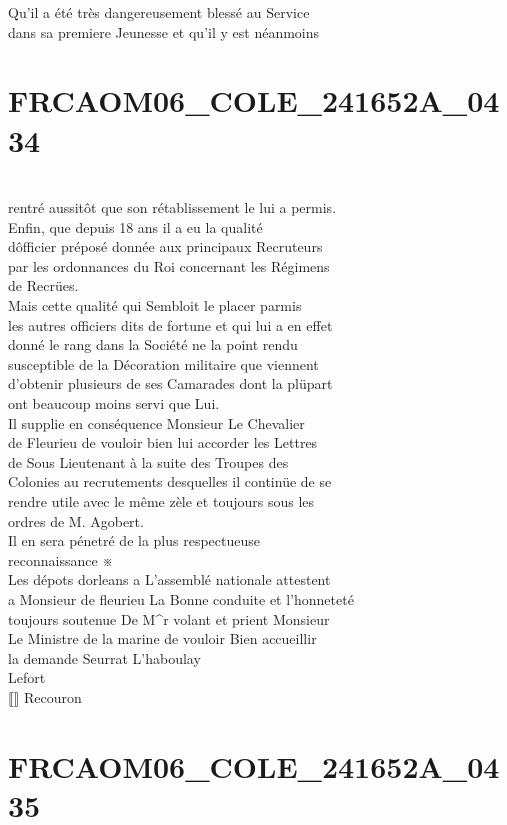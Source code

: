 \documentclass{article}
\begin{document}
\begin{pages}
Qu'il a été très dangereusement blessé au Service\\
dans sa premiere Jeunesse et qu'il y est néanmoins
\pend
\endnumbering\beginnumbering\section{FRCAOM06\_COLE\_241652A\_0434}\pstart
\\
rentré aussitôt que son rétablissement le lui a permis.\\
Enfin, que depuis 18 ans il a eu la qualité\\
dôfficier préposé donnée aux principaux Recruteurs\\
par les ordonnances du Roi concernant les Régimens\\
de Recrües.\\
Mais cette qualité qui Sembloit le placer parmis\\
les autres officiers dits de fortune et qui lui a en effet\\
donné le rang dans la Société ne la point rendu\\
susceptible de la Décoration militaire que viennent\\
d'obtenir plusieurs de ses Camarades dont la plüpart\\
ont beaucoup moins servi que Lui.\\
Il supplie en conséquence Monsieur Le Chevalier\\
de Fleurieu de vouloir bien lui accorder les Lettres\\
de Sous Lieutenant à la suite des Troupes des\\
Colonies au recrutements desquelles il continüe de se\\
rendre utile avec le même zèle et toujours sous les\\
ordres de M. Agobert.\\
Il en sera pénetré de la plus respectueuse\\
reconnaissance ※\\
Les dépots dorleans a L'assemblé nationale attestent\\
a Monsieur de fleurieu La Bonne conduite et l'honneteté\\
toujours soutenue De M\^{}r volant et prient Monsieur\\
Le Ministre de la marine de vouloir Bien accueillir\\
la demande Seurrat L'haboulay\\
Lefort\\
⟦⟧ Recouron
\pend
\endnumbering\beginnumbering\section{FRCAOM06\_COLE\_241652A\_0435}\pstart

\end{pages}
\end{document}
